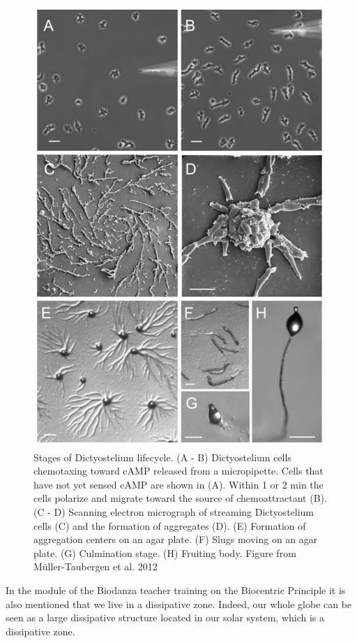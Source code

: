 \documentclass[
  11pt,
]{book}
\begin{document}
\begin{figure}

{\centering \includegraphics[width=0.6\linewidth]{./figs/Dictyostelida} 

}

\caption{Stages of Dictyostelium lifecycle. (A - B) Dictyostelium cells chemotaxing toward cAMP released from a micropipette. Cells that have not yet sensed cAMP are shown in (A). Within 1 or 2 min the cells polarize and migrate toward the source of chemoattractant (B). (C - D) Scanning electron micrograph of streaming Dictyostelium cells (C) and the formation of aggregates (D). (E) Formation of aggregation centers on an agar plate. (F) Slugs moving on an agar plate. (G) Culmination stage. (H) Fruiting body. Figure from Müller-Taubergen et al. 2012}\label{fig:Dictyostelium}
\end{figure}

\newpage

In the module of the Biodanza teacher training on the Biocentric Principle it is also mentioned that we live in a dissipative zone. Indeed, our whole globe can be seen as a large dissipative structure located in our solar system, which is a dissipative zone.
\end{document}
